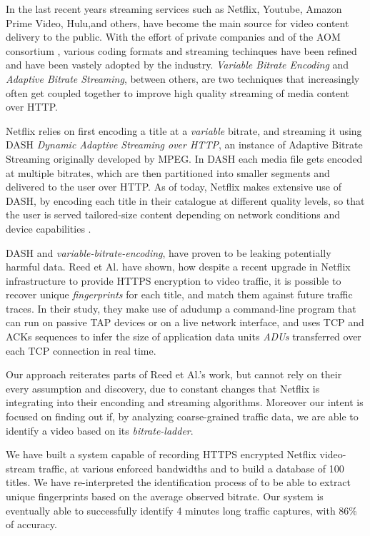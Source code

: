 
In the last recent years streaming services such as Netflix, Youtube, Amazon
Prime Video, Hulu,and others, have become the main source for video content
delivery to the public. With the effort of private companies and of the AOM
consortium \cite{aom}, various coding formats and streaming techinques have
been refined and have been vastely adopted by the industry.  \emph{Variable
Bitrate Encoding} and \emph{Adaptive Bitrate Streaming}, between others, are
two techniques that increasingly often get coupled together to improve high
quality streaming of media content over HTTP.

Netflix relies on first encoding a title at a \emph{variable} bitrate, and
streaming it using DASH \textit{Dynamic Adaptive Streaming over HTTP}, an
instance of Adaptive Bitrate Streaming originally developed by MPEG. In DASH
each media file gets encoded at multiple bitrates, which are then partitioned
into smaller segments and delivered to the user over HTTP. As of today, Netflix
makes extensive use of DASH, by encoding each title in their catalogue at
different quality levels, so that the user is served tailored-size content
depending on network conditions and device capabilities
\cite{per-title-encoding}.

DASH and \emph{variable-bitrate-encoding}, have proven to be leaking
potentially harmful data. Reed et Al. \cite{netflix-real-time} have shown, how
despite a recent upgrade in Netflix infrastructure to provide HTTPS encryption
to video traffic, it is possible to recover unique \emph{fingerprints} for each
title, and match them against future traffic traces. In their study, they make
use of adudump \cite{adudump} a command-line program that can run on passive
TAP devices \cite{tap} or on a live network interface, and uses TCP and ACKs
sequences to infer the size of application data units \emph{ADUs} transferred
over each TCP connection in real time.

Our approach reiterates parts of Reed et Al.'s work, but cannot rely on their
every assumption and discovery, due to constant changes that Netflix is
integrating into their enconding and streaming algorithms. Moreover our intent
is focused on finding out if, by analyzing coarse-grained traffic data, we are
able to identify a video based on its \emph{bitrate-ladder}.

We have built a system capable of recording HTTPS encrypted Netflix
video-stream traffic, at various enforced bandwidths and to build a database of
100 titles. We have re-interpreted the identification process of
\cite{netflix-real-time} to be able to extract unique fingerprints based on the
average observed bitrate. Our system is eventually able to successfully
identify 4 minutes long traffic captures, with 86\% of accuracy. 
